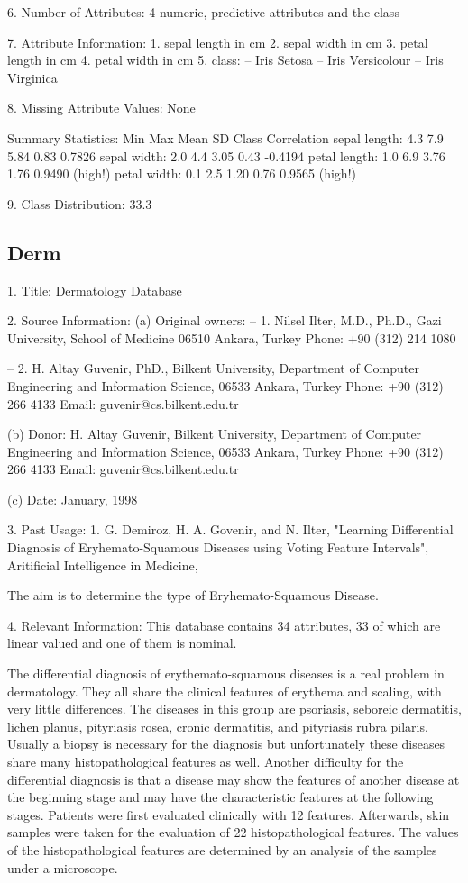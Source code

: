\documentclass[letterpaper,12pt,titlepage,oneside,final]{book}
\begin{document}
	6. Number of Attributes: 4 numeric, predictive attributes and the class
	
	7. Attribute Information:
	1. sepal length in cm
	2. sepal width in cm
	3. petal length in cm
	4. petal width in cm
	5. class: 
	-- Iris Setosa
	-- Iris Versicolour
	-- Iris Virginica
	
	8. Missing Attribute Values: None
	
	Summary Statistics:
	Min  Max   Mean    SD   Class Correlation
	sepal length: 4.3  7.9   5.84  0.83    0.7826   
	sepal width: 2.0  4.4   3.05  0.43   -0.4194
	petal length: 1.0  6.9   3.76  1.76    0.9490  (high!)
	petal width: 0.1  2.5   1.20  0.76    0.9565  (high!)
	
	9. Class Distribution: 33.3%
	
	\subsection{Derm}
	1. Title: Dermatology Database
	
	2. Source Information:
	(a) Original owners:
	-- 1. Nilsel Ilter, M.D., Ph.D., 
	Gazi University, 
	School of Medicine
	06510 Ankara, Turkey
	Phone: +90 (312) 214 1080
	
	-- 2. H. Altay Guvenir, PhD., 
	Bilkent University,
	Department of Computer Engineering and Information Science,
	06533 Ankara, Turkey
	Phone: +90 (312) 266 4133
	Email: guvenir@cs.bilkent.edu.tr
	
	(b) Donor: H. Altay Guvenir,
	Bilkent University,
	Department of Computer Engineering and Information Science,
	06533 Ankara, Turkey
	Phone: +90 (312) 266 4133
	Email: guvenir@cs.bilkent.edu.tr
	
	(c) Date:  January, 1998
	
	3. Past Usage:
	1. G. Demiroz, H. A. Govenir, and N. Ilter, 
	"Learning Differential Diagnosis of Eryhemato-Squamous Diseases using
	Voting Feature Intervals", Aritificial Intelligence in Medicine,
	
	The aim is to determine the type of Eryhemato-Squamous Disease.
	
	4. Relevant Information:
	This database contains 34 attributes, 33 of which are linear
	valued and one of them is nominal. 
	
	The differential diagnosis of erythemato-squamous diseases is a real
	problem in dermatology. They all share the clinical features of
	erythema and scaling, with very little differences. The diseases in
	this group are psoriasis, seboreic dermatitis, lichen planus, 
	pityriasis rosea, cronic dermatitis, and pityriasis rubra pilaris.
	Usually a biopsy is necessary for the diagnosis but unfortunately
	these diseases share many histopathological features as
	well. Another difficulty for the differential diagnosis is that a
	disease may show the features of another disease at the beginning
	stage and may have the characteristic features at the following stages. 
	Patients were first evaluated clinically with 12 features.
	Afterwards, skin samples were taken for the evaluation of 22
	histopathological features. The values of the histopathological features
	are determined by an analysis of the samples under a microscope. 
	
\end{document}
